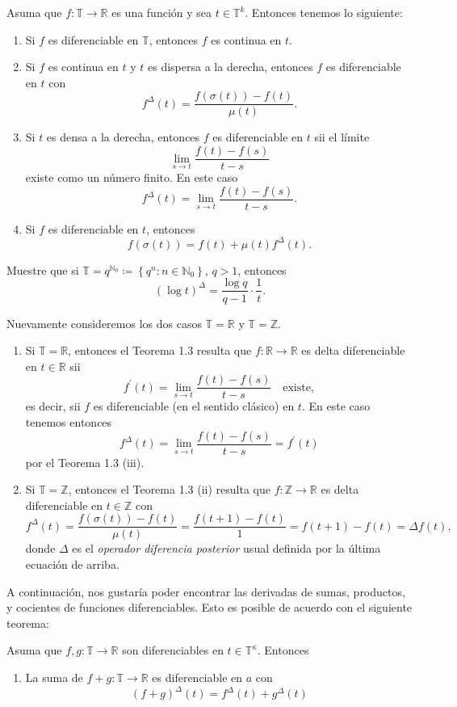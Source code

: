 \begin{theorem}{}
	Asuma que $f\colon\mathds{T}\rightarrow\mathds{R}$ es una función y sea $t\in\mathds{T}^{k}$. Entonces tenemos lo siguiente:
	\begin{enumerate}
		\item Si $f$ es diferenciable en $\mathds{T}$, entonces $f$ es continua en $t$.
		\item Si $f$ es continua en $t$ y $t$ es dispersa a la derecha, entonces $f$ es diferenciable en $t$ con \[ f^{\Delta}(t)=\frac{f(\sigma(t))-f(t)}{\mu(t)}. \]
		\item Si $t$ es densa a la derecha, entonces $f$ es diferenciable en $t$ sii el límite \[ \lim_{s\to t}\frac{f(t)-f(s)}{t-s} \] existe como un número finito. En este caso \[ f^{\Delta}(t)=\lim_{s\to t}\frac{f(t)-f(s)}{t-s}. \]
		\item Si $f$ es diferenciable en $t$, entonces \[ f(\sigma(t))=f(t)+\mu(t)f^{\Delta}(t). \]
	\end{enumerate}
\end{theorem}
\begin{exercise}
	Muestre que si $\mathds{T}=q^{\mathds{N}_{0}}\coloneqq\left\{q^{n}:n\in\mathds{N}_{0}\right\}$, $q>1$, entonces \[ {\left(\log t\right)}^{\Delta}=\frac{\log q}{q-1}\cdot\frac{1}{t}. \]
\end{exercise}
\begin{example}{}
	Nuevamente consideremos los dos casos $\mathds{T}=\mathds{R}$ y $\mathds{T}=\mathds{Z}$.
	\begin{enumerate}
		\item Si $\mathds{T}=\mathds{R}$, entonces el Teorema 1.3 resulta que $f\colon\mathds{R}\rightarrow\mathds{R}$ es delta diferenciable en $t\in\mathds{R}$ sii \[ f^{\prime}(t)=\lim_{s\to t}\frac{f(t)-f(s)}{t-s}\quad\text{existe}, \] es decir, sii $f$ es diferenciable (en el sentido clásico) en $t$. En este caso tenemos entonces \[ f^{\Delta}(t)=\lim_{s\to t}\frac{f(t)-f(s)}{t-s}=f^{\prime}(t) \] por el Teorema 1.3 (iii).
		\item Si $\mathds{T}=\mathds{Z}$, entonces el Teorema 1.3 (ii) resulta que $f\colon\mathds{Z}\rightarrow\mathds{R}$ es delta diferenciable en $t\in\mathds{Z}$ con \[ f^{\Delta}(t)=\frac{f(\sigma(t))-f(t)}{\mu(t)}=\frac{f(t+1)-f(t)}{1}=f(t+1)-f(t)=\Delta f(t), \] donde $\Delta$ es el \emph{operador diferencia posterior} usual definida por la última ecuación de arriba.
	\end{enumerate}
\end{example}

A continuación, nos gustaría poder encontrar las derivadas de sumas, productos, y cocientes de funciones diferenciables. Esto es posible de acuerdo con el siguiente teorema:
\begin{theorem}{}
	Asuma que $f,g\colon\mathds{T}\rightarrow\mathds{R}$ son diferenciables en $t\in\mathds{T}^{\kappa}$. Entonces
	\begin{enumerate}
		\item La suma de $f+g\colon\mathds{T}\rightarrow\mathds{R}$ es diferenciable en $a$ con \[ {\left(f+g\right)}^{\Delta}(t)=f^{\Delta}(t)+g^{\Delta}(t) \]
	\end{enumerate}
\end{theorem}